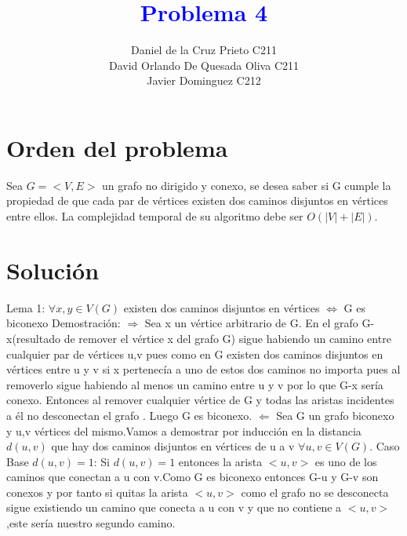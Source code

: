 \documentclass{article}
\begin{document}
    \title{\textcolor{blue}{\textbf{Problema 4 }}\\}
    \author{Daniel de la Cruz Prieto C211\\ David Orlando De Quesada Oliva C211\\Javier Dominguez C212} 
    \date{}
    \maketitle  

    \section{Orden del problema} 
    Sea $G = <V, E>$ un grafo no dirigido y conexo, se desea saber si G cumple la propiedad de que cada par de
    v\'ertices existen dos caminos disjuntos en v\'ertices entre ellos. La complejidad temporal de su algoritmo debe
    ser $O(|V| + |E|)$.
    \newline
    \newline
    \section{Soluci\'on} 
    Lema 1:\newline
    $\forall x,y\in V(G)$ existen dos caminos disjuntos en v\'ertices $\Longleftrightarrow$ G es biconexo \newline
    \newline
    Demostraci\'on:\newline
    $\Longrightarrow$\newline
    Sea x un v\'ertice arbitrario de G. En el grafo G-x(resultado de remover el v\'ertice x del grafo G)
    sigue habiendo un camino entre cualquier par de v\'ertices u,v pues como en G existen dos caminos disjuntos en v\'ertices
    entre u y v si x pertenec\'ia a uno de estos dos caminos no importa pues al removerlo sigue habiendo al menos un camino 
    entre u y v por lo que G-x ser\'ia conexo. Entonces al remover cualquier v\'ertice de G y todas las aristas incidentes a
    \'el no desconectan el grafo . Luego G es biconexo.\newline
    $\Longleftarrow$\newline
    Sea G un grafo biconexo y u,v v\'ertices del mismo.Vamos a demostrar por inducci\'on en la distancia $d(u,v)$ que hay
    dos caminos disjuntos en v\'ertices de u a v $\forall u,v \in V(G)$.
    \newline
    Caso Base $d(u,v)=1$:\newline
    Si $d(u,v)=1$ entonces la arista $<u,v>$ es uno de los caminos que conectan a u con v.Como G es biconexo entonces 
    G-u y G-v son conexos y por tanto si quitas la  arista $<u,v>$  como el grafo no se desconecta sigue existiendo
    un camino que conecta a u con v y que no contiene a $<u,v>$ ,este ser\'ia nuestro segundo camino.\newline
    
\end{document}
